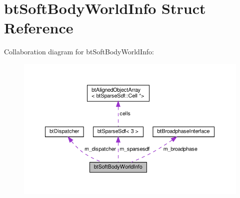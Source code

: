\hypertarget{structbtSoftBodyWorldInfo}{}\section{bt\+Soft\+Body\+World\+Info Struct Reference}
\label{structbtSoftBodyWorldInfo}


Collaboration diagram for bt\+Soft\+Body\+World\+Info\+:
\nopagebreak
\begin{figure}[H]
\begin{center}
\leavevmode
\includegraphics[width=350pt]{structbtSoftBodyWorldInfo__coll__graph}
\end{center}
\end{figure}
